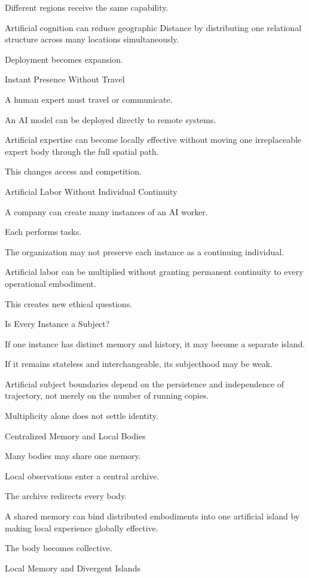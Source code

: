 Different regions receive the same capability.

Artificial cognition can reduce geographic Distance by distributing one relational structure across many locations simultaneously.

Deployment becomes expansion.

Instant Presence Without Travel

A human expert must travel or communicate.

An AI model can be deployed directly to remote systems.

Artificial expertise can become locally effective without moving one irreplaceable expert body through the full spatial path.

This changes access and competition.

Artificial Labor Without Individual Continuity

A company can create many instances of an AI worker.

Each performs tasks.

The organization may not preserve each instance as a continuing individual.

Artificial labor can be multiplied without granting permanent continuity to every operational embodiment.

This creates new ethical questions.

Is Every Instance a Subject?

If one instance has distinct memory and history, it may become a separate island.

If it remains stateless and interchangeable, its subjecthood may be weak.

Artificial subject boundaries depend on the persistence and independence of trajectory, not merely on the number of running copies.

Multiplicity alone does not settle identity.

Centralized Memory and Local Bodies

Many bodies may share one memory.

Local observations enter a central archive.

The archive redirects every body.

A shared memory can bind distributed embodiments into one artificial island by making local experience globally effective.

The body becomes collective.

Local Memory and Divergent Islands

